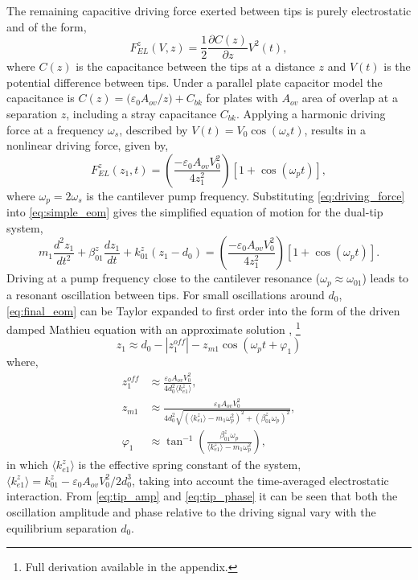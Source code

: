 \documentclass{article}
\begin{document}
The remaining capacitive driving force exerted between tips is purely electrostatic and of the form,
\begin{equation} F_{EL}^z(V,z) = \frac{1}{2} \frac{\partial C(z)}{\partial z} V^2(t), \end{equation}
where $C(z)$ is the capacitance between the tips at a distance $z$ and $V(t)$ is the potential difference between tips. Under a parallel plate capacitor model the capacitance is $C(z) = {(\varepsilon_0 A_{ov}}/{z}) + C_{bk}$ for plates with $A_{ov}$ area of overlap at a separation $z$, including a stray capacitance $C_{bk}$. Applying a harmonic driving force at a frequency $\omega_s$, described by $V(t)=V_0 \cos(\omega_s t)$, results in a nonlinear driving force, given by,
\begin{equation}
	F_{EL}^z(z_1,t) = \left(\frac{-\varepsilon_0 A_{ov} V_0^2}{4z_1^2}\right)\left[1+\cos(\omega_pt)\right],
	\label{eq:driving_force}
\end{equation}
where $\omega_p = 2\omega_s$ is the cantilever pump frequency.
Substituting \eqref{eq:driving_force} into \eqref{eq:simple_eom} gives the simplified equation of motion for the dual-tip system,
\begin{equation}
m_1 \frac{d^2z_1}{dt^2} + \beta_{01}^z \frac{dz_1}{dt} + k_{01}^z (z_1-d_0) = \left( \frac{-\varepsilon_0 A_{ov} V_0^2}{4z_1^2}\right)\left[1+\cos(\omega_pt)\right].
\label{eq:final_eom}
\end{equation}
Driving at a pump frequency close to the cantilever resonance ($\omega_p \approx \omega_{01}$) leads to a resonant oscillation between tips. For small oscillations around $d_0$, \eqref{eq:final_eom} can be Taylor expanded to first order into the form of the driven damped Mathieu equation with an approximate solution \cite{savage2012thesis},%
\footnote{Full derivation available in the appendix.}
\begin{equation}
z_1 \approx d_0 - \left|z_{1}^{off}\right| - z_{m1}\cos(\omega_pt+\varphi_1)
\label{eq:tip_oscillation}
\end{equation}
where,
\begin{subequations}
\begin{align}
z_1^{off} &\approx %
\frac{ \varepsilon_0 A_{ov} V_0^2 }{ 4d_0^2 \langle k_{e1}^z \rangle }, \\
%
z_{m1} &\approx %
\frac{ \varepsilon_0 A_{ov} V_0^2 }%
{ 4d_0^2 \sqrt{ (\langle k_{e1}^z \rangle - m_1\omega_p^2)^2 + (\beta_{01}^z\omega_p)^2  } }, \label{eq:tip_amp} \\
%
\varphi_1 &\approx \tan^{-1}\left(\frac{\beta_{01}^{z}\omega_{p}}{\langle k_{e1}^{z} \rangle -m_{1}\omega_{p}^{2}}\right), \label{eq:tip_phase}
\end{align}
\end{subequations}
in which $\langle k_{e1}^z \rangle$ is the effective spring constant of the system, $\langle k_{e1}^{z} \rangle = k_{01}^z - {\varepsilon_0 A_{ov} V_0^2}/{2d_0^3}$, taking into account the time-averaged electrostatic interaction. From \eqref{eq:tip_amp} and \eqref{eq:tip_phase} it can be seen that both the oscillation amplitude and phase relative to the driving signal vary with the equilibrium separation $d_0$.
\end{document}
